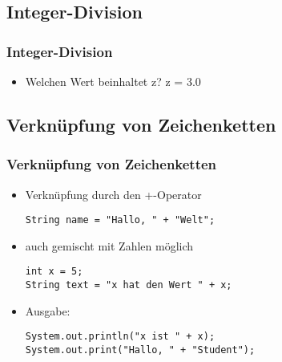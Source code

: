 \documentclass[final]{beamer}
\begin{document}
\subsection{Integer-Division}
\begin{frame}[fragile]
  \frametitle{Integer-Division}
  \begin{itemize}
    \begin{lstlisting}
int x = 7;

int y = 2;

double z = x / y;
    \end{lstlisting}
    \item[] Welchen Wert beinhaltet z? \qquad \pause z = 3.0
  \end{itemize}
\end{frame}

\subsection{Verknüpfung von Zeichenketten}
\begin{frame}[fragile]
  \frametitle{Verknüpfung von Zeichenketten}
  \begin{itemize}
    \item Verknüpfung durch den +-Operator
    \begin{lstlisting}[morekeywords={type,String}]
String name = "Hallo, " + "Welt";
    \end{lstlisting}
    \item auch gemischt mit Zahlen möglich
    \begin{lstlisting}
int x = 5;
String text = "x hat den Wert " + x;
    \end{lstlisting}
    \item Ausgabe:
    \begin{lstlisting}
System.out.println("x ist " + x);
System.out.print("Hallo, " + "Student");
    \end{lstlisting}
  \end{itemize}
\end{frame}
\end{document}
